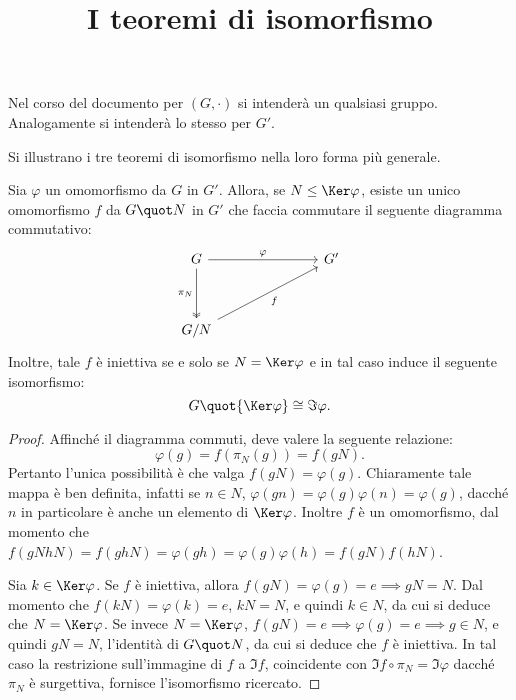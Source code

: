 \documentclass[12pt]{scrartcl}
\begin{document}
	\title{I teoremi di isomorfismo}
	\maketitle
	
	\begin{note}
		Nel corso del documento per $(G, \cdot)$ si intenderà un qualsiasi gruppo. Analogamente si intenderà lo stesso per
		$G'$.
	\end{note}
	
	Si illustrano i tre teoremi di isomorfismo nella loro
	forma più generale.
	
	\begin{theorem}
		Sia $\varphi$ un omomorfismo da $G$ in $G'$. Allora,
		se $N \leq \Ker \varphi$, esiste un unico omomorfismo
		$f$ da $G \quot N$ in $G'$ che faccia commutare il
		seguente diagramma commutativo:
		\[\begin{tikzcd}
			G &&& {G'} \\
			\\
			{G/N}
			\arrow["{\pi_N}"', two heads, from=1-1, to=3-1]
			\arrow["\varphi", from=1-1, to=1-4]
			\arrow["f"', from=3-1, to=1-4]
		\end{tikzcd}\]
		Inoltre, tale $f$ è iniettiva se e solo se $N = \Ker \varphi$
		e in tal caso induce il seguente isomorfismo:
		\[ G \quot {\Ker \varphi} \cong \Im \varphi. \]
	\end{theorem}
	
	\begin{proof}
		Affinché il diagramma commuti, deve valere la seguente
		relazione:
		\[ \varphi(g) = f(\pi_N(g)) = f(gN). \]
		Pertanto l'unica possibilità è che valga $f(gN) = \varphi(g)$.
		Chiaramente tale mappa è ben definita, infatti se $n \in N$,
		$\varphi(gn) = \varphi(g) \varphi(n) = \varphi(g)$, dacché
		$n$ in particolare è anche un elemento di $\Ker \varphi$.
		Inoltre $f$ è un omomorfismo, dal momento che
		$f(gN hN) = f(ghN) = \varphi(gh) = \varphi(g) \varphi(h) =
		f(gN) f(hN)$. \medskip
		
		
		Sia $k \in \Ker \varphi$. Se $f$ è iniettiva, allora $f(gN) = \varphi(g) = e \implies gN = N$. Dal momento che
		$f(kN) = \varphi(k) = e$, $kN = N$, e quindi $k \in N$,
		da cui si deduce che $N = \Ker \varphi$. Se invece
		$N = \Ker \varphi$, $f(gN) = e \implies \varphi(g) = e \implies g \in N$, e quindi $gN = N$, l'identità di
		$G \quot N$, da cui si deduce che $f$ è iniettiva. In tal
		caso la restrizione sull'immagine di $f$ a
		$\Im f$, coincidente con $\Im f \circ \pi_N = \Im \varphi$
		dacché $\pi_N$ è surgettiva, fornisce l'isomorfismo
		ricercato. 
	\end{proof}
	
\end{document}
